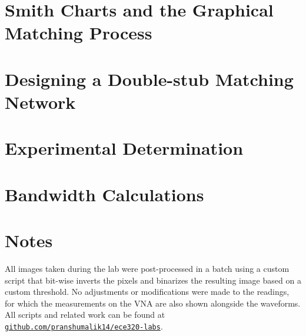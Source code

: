 \documentclass[10pt]{article}
\begin{document}
\section{Smith Charts and the Graphical Matching Process}
\section{Designing a Double-stub Matching Network}
\section{Experimental Determination }
\section{Bandwidth Calculations}
\section{Notes}

All images taken during the lab were post-processed in a batch using a custom script
that bit-wise inverts the pixels and binarizes the resulting image based on a custom threshold.
No adjustments or modifications were made to the readings, for which the measurements on the VNA
are also shown alongside the waveforms. All scripts and related work can be found at 
\href{https://github.com/pranshumalik14/ece320-labs}{\texttt{github.com/pranshumalik14/ece320-labs}}.
\end{document}
